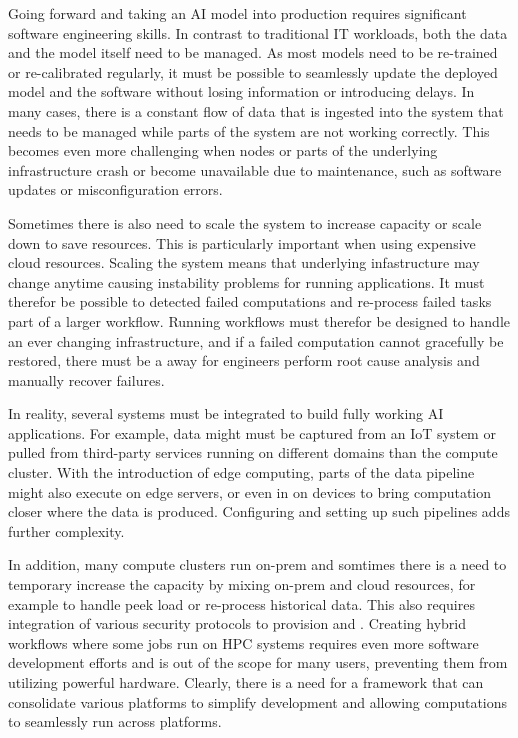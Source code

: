 \documentclass{article}
\begin{document}
Going forward and taking an AI model into production requires significant software engineering skills. In contrast to traditional IT workloads, both the data and the model itself need to be managed. As most models need to be re-trained or re-calibrated regularly, it must be possible to seamlessly update the deployed model and the software without losing information or introducing delays. In many cases, there is a constant flow of data that is ingested into the system that needs to be managed while parts of the system are not working correctly. This becomes even more challenging when nodes or parts of the underlying infrastructure crash or become unavailable due to maintenance, such as software updates or misconfiguration errors.

Sometimes there is also need to scale the system to increase capacity or scale down to save resources. This is particularly important when using expensive cloud resources. Scaling the system means that underlying infastructure may change anytime causing instability problems for running applications. It must therefor be possible to detected failed computations and re-process failed tasks part of a larger workflow. Running workflows must therefor be designed to handle an ever changing infrastructure, and if a failed computation cannot gracefully be restored, there must be a away for engineers perform root cause analysis and manually recover failures.

In reality, several systems must be integrated to build fully working AI applications. For example, data might must be captured from an IoT system or pulled from third-party services running on different domains than the compute cluster. With the introduction of edge computing, parts of the data pipeline might also execute on edge servers, or even in on devices to bring computation closer where the data is produced. Configuring and setting up such pipelines adds further complexity. 

In addition, many compute clusters run on-prem and somtimes there is a need to temporary increase the capacity by mixing on-prem and cloud resources, for example to handle peek load or re-process historical data. This also requires integration of various security protocols to provision and . Creating hybrid workflows where some jobs run on HPC systems requires even more software development efforts and is out of the scope for many users, preventing them from utilizing powerful hardware. Clearly, there is a need for a framework that can consolidate various platforms to simplify development and allowing computations to seamlessly run across platforms.
\end{document}
